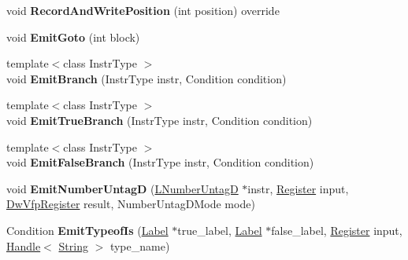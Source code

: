 \begin{DoxyCompactItemize}
\item 
void {\bfseries Record\+And\+Write\+Position} (int position) override\hypertarget{classv8_1_1internal_1_1_l_code_gen_a7f2c2fb5fe21ed4f96fa43839a3c459d}{}\label{classv8_1_1internal_1_1_l_code_gen_a7f2c2fb5fe21ed4f96fa43839a3c459d}

\item 
void {\bfseries Emit\+Goto} (int block)\hypertarget{classv8_1_1internal_1_1_l_code_gen_a77ef06fc94dce505c88f628d129c114d}{}\label{classv8_1_1internal_1_1_l_code_gen_a77ef06fc94dce505c88f628d129c114d}

\item 
{\footnotesize template$<$class Instr\+Type $>$ }\\void {\bfseries Emit\+Branch} (Instr\+Type instr, Condition condition)\hypertarget{classv8_1_1internal_1_1_l_code_gen_af34ca2c4fbc9ddc61b5d7c6c46695b07}{}\label{classv8_1_1internal_1_1_l_code_gen_af34ca2c4fbc9ddc61b5d7c6c46695b07}

\item 
{\footnotesize template$<$class Instr\+Type $>$ }\\void {\bfseries Emit\+True\+Branch} (Instr\+Type instr, Condition condition)\hypertarget{classv8_1_1internal_1_1_l_code_gen_af5f134222fdb005529a62b0eac9c41e5}{}\label{classv8_1_1internal_1_1_l_code_gen_af5f134222fdb005529a62b0eac9c41e5}

\item 
{\footnotesize template$<$class Instr\+Type $>$ }\\void {\bfseries Emit\+False\+Branch} (Instr\+Type instr, Condition condition)\hypertarget{classv8_1_1internal_1_1_l_code_gen_aea56de5987e8e4906c8289d9d20f4f28}{}\label{classv8_1_1internal_1_1_l_code_gen_aea56de5987e8e4906c8289d9d20f4f28}

\item 
void {\bfseries Emit\+Number\+UntagD} (\hyperlink{classv8_1_1internal_1_1_l_number_untag_d}{L\+Number\+UntagD} $\ast$instr, \hyperlink{structv8_1_1internal_1_1_register}{Register} input, \hyperlink{structv8_1_1internal_1_1_double_register}{Dw\+Vfp\+Register} result, Number\+Untag\+D\+Mode mode)\hypertarget{classv8_1_1internal_1_1_l_code_gen_add59feb8a651ebf70b0417dd576eb13c}{}\label{classv8_1_1internal_1_1_l_code_gen_add59feb8a651ebf70b0417dd576eb13c}

\item 
Condition {\bfseries Emit\+Typeof\+Is} (\hyperlink{classv8_1_1internal_1_1_label}{Label} $\ast$true\+\_\+label, \hyperlink{classv8_1_1internal_1_1_label}{Label} $\ast$false\+\_\+label, \hyperlink{structv8_1_1internal_1_1_register}{Register} input, \hyperlink{classv8_1_1internal_1_1_handle}{Handle}$<$ \hyperlink{classv8_1_1internal_1_1_string}{String} $>$ type\+\_\+name)\hypertarget{classv8_1_1internal_1_1_l_code_gen_a5a55e449dc173cc3d5f458623d904e34}{}\label{classv8_1_1internal_1_1_l_code_gen_a5a55e449dc173cc3d5f458623d904e34}


\end{DoxyCompactItemize}
